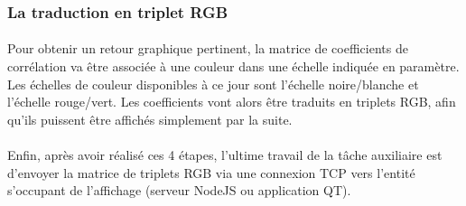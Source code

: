 \subsubsection{La traduction en triplet RGB}
\paragraph{}
Pour obtenir un retour graphique pertinent, la matrice de coefficients de corrélation va être associée à une couleur dans une échelle indiquée en paramètre. Les échelles de couleur disponibles à ce jour sont l'échelle noire/blanche et l'échelle rouge/vert. Les coefficients vont alors être traduits en triplets RGB, afin qu'ils puissent être affichés simplement par la suite.
\paragraph{}
Enfin, après avoir réalisé ces 4 étapes, l'ultime travail de la tâche auxiliaire est d'envoyer la matrice de triplets RGB via une connexion TCP vers l'entité s'occupant de l'affichage (serveur NodeJS ou application QT).

